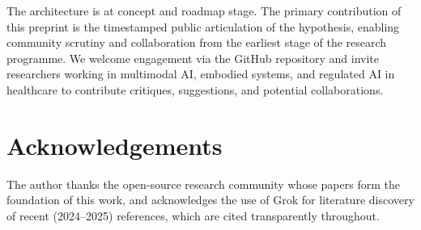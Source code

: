 \documentclass[11pt,a4paper]{article}
\begin{document}
The architecture is at concept and roadmap stage.  The primary contribution of this
preprint is the timestamped public articulation of the hypothesis, enabling community
scrutiny and collaboration from the earliest stage of the research programme.  We
welcome engagement via the GitHub repository and invite researchers working in
multimodal AI, embodied systems, and regulated AI in healthcare to contribute
critiques, suggestions, and potential collaborations.

\section*{Acknowledgements}

The author thanks the open-source research community whose papers form the
foundation of this work, and acknowledges the use of Grok for literature discovery of
recent (2024--2025) references, which are cited transparently throughout.


\end{document}
